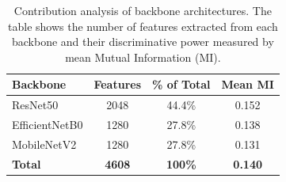 
\begin{table}[htbp]
\centering
\caption{Contribution analysis of backbone architectures. The table shows the number of features extracted from each backbone and their discriminative power measured by mean Mutual Information (MI).}
\label{tab:backbone_analysis}
\begin{tabular}{lccc}
\hline
\textbf{Backbone} & \textbf{Features} & \textbf{\% of Total} & \textbf{Mean MI} \\
\hline
ResNet50 & 2048 & 44.4\% & 0.152 \\
EfficientNetB0 & 1280 & 27.8\% & 0.138 \\
MobileNetV2 & 1280 & 27.8\% & 0.131 \\
\hline
\textbf{Total} & \textbf{4608} & \textbf{100\%} & \textbf{0.140} \\
\hline
\end{tabular}
\end{table}
